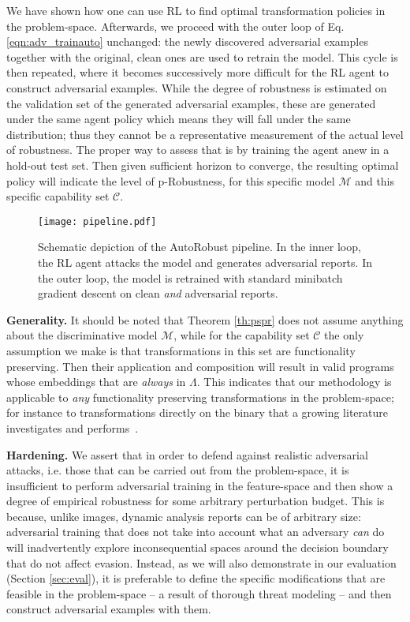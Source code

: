 We have shown how one can use RL to find optimal transformation policies in the problem-space.
Afterwards, we proceed with the outer loop of Eq. \eqref{eqn:adv_trainauto} unchanged: the newly discovered adversarial examples together with the original, clean ones are used to retrain the model.
This cycle is then repeated, where it becomes successively more difficult for the RL agent to construct adversarial examples.
While the degree of robustness is estimated on the validation set of the generated adversarial examples, these are generated under the same agent policy which means they will fall under the same distribution; thus they cannot be a representative measurement of the actual level of robustness.
The proper way to assess that is by training the agent anew in a hold-out test set.
Then given sufficient horizon to converge, the resulting optimal policy will indicate the level of p-Robustness, for this specific model $\mathcal{M}$ and this specific capability set $\mathcal{C}$.

\begin{figure*}[!t]
\centering
\texttt{[image: pipeline.pdf]}
\caption{Schematic depiction of the AutoRobust pipeline. In the inner loop, the RL agent attacks the model and generates adversarial reports. In the outer loop, the model is retrained with standard minibatch gradient descent on clean \textit{and} adversarial reports.}
\label{fig:autorobust}
\end{figure*}

\textbf{Generality.} It should be noted that Theorem \ref{th:pspr} does not assume anything about the discriminative model $\mathcal{M}$, while for the capability set $\mathcal{C}$ the only assumption we make is that transformations in this set are functionality preserving.
Then their application and composition will result in valid programs whose embeddings that are \textit{always} in $\Lambda$.
This indicates that our methodology is applicable to \textit{any} functionality preserving transformations in the problem-space; for instance to transformations directly on the binary that a growing literature investigates and performs~\cite{demetrio2021adversarial, demetrio2021functionality, labaca2021realizable, labaca2021aimed}.

\textbf{Hardening.} We assert that in order to defend against realistic adversarial attacks, i.e. those that can be carried out from the problem-space, it is insufficient to perform adversarial training in the feature-space and then show a degree of empirical robustness for some arbitrary perturbation budget.
This is because, unlike images, dynamic analysis reports can be of arbitrary size: adversarial training that does not take into account what an adversary \textit{can} do will inadvertently explore inconsequential spaces around the decision boundary that do not affect evasion.
Instead, as we will also demonstrate in our evaluation (Section \ref{sec:eval}), it is preferable to define the specific modifications that are feasible in the problem-space -- a result of thorough threat modeling -- and then construct adversarial examples with them.

